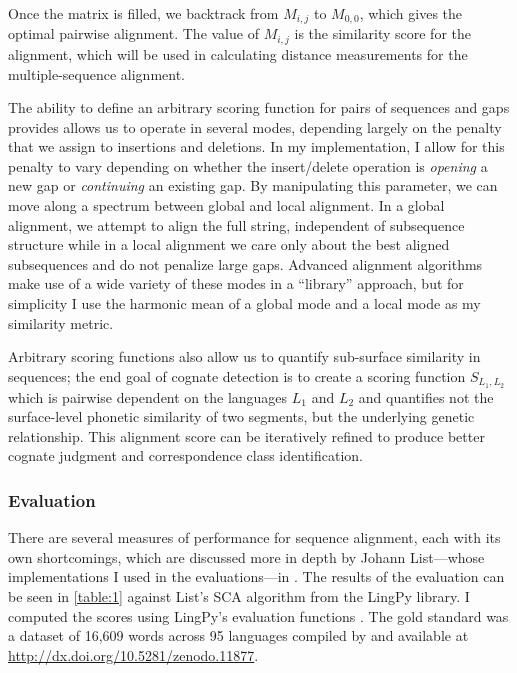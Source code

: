 \documentclass[doc,natbib]{apa6}
\begin{document}
Once the matrix is filled, we backtrack from $M_{i,j}$ to $M_{0,0}$, which gives the optimal pairwise alignment. The value of $M_{i,j}$ is the similarity score for the alignment, which will be used in calculating distance measurements for the multiple-sequence alignment. 

The ability to define an arbitrary scoring function for pairs of sequences and gaps provides allows us to operate in several modes, depending largely on the penalty that we assign to insertions and deletions. In my implementation, I allow for this penalty to vary depending on whether the insert/delete operation is \emph{opening} a new gap or \emph{continuing} an existing gap. By manipulating this parameter, we can move along a spectrum between global and local alignment. In a global alignment, we attempt to align the full string, independent of subsequence structure while in a local alignment we care only about the best aligned subsequences and do not penalize large gaps.  Advanced alignment algorithms make use of a wide variety of these modes in a ``library'' approach, but for simplicity I use the harmonic mean of a global mode and a local mode as my similarity metric.

Arbitrary scoring functions also allow us to quantify sub-surface similarity in sequences; the end goal of cognate detection is to create a scoring function $S_{L_1,L_2}$ which is pairwise dependent on the languages $L_1$ and $L_2$ and quantifies not the surface-level phonetic similarity of two segments, but the underlying genetic relationship. This alignment score can be iteratively refined to produce better cognate judgment and correspondence class identification. 

\subsubsection{Evaluation}

There are several measures of performance for sequence alignment, each with its own shortcomings, which are discussed more in depth by Johann List---whose implementations I used in the evaluations---in \citep{List2012b}. The results of the evaluation can be seen in \ref{table:1} against List's SCA algorithm from the LingPy library. I computed the scores using LingPy's evaluation functions \citep{List2016}. The gold standard was a dataset of 16,609 words across 95 languages compiled by \citet{List2014} and available at \url{http://dx.doi.org/10.5281/zenodo.11877}.
\begin{table}[h]
\end{table}
\end{document}
